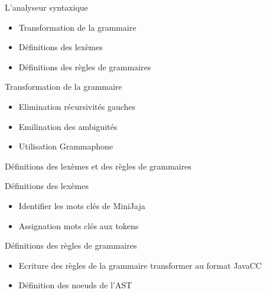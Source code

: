\begin{chapter}{}{L'analyseur syntaxique}
    \begin{itemize}
          \item Transformation de la grammaire
          \item Définitions des lexèmes
          \item Définitions des règles de grammaires
    \end{itemize}
\end{chapter}

\begin{frame}{Transformation de la grammaire}
    \begin{block}{}
        \begin{itemize}
            \item Elimination récursivités gauches
            \item Emilination des ambiguités
            \item Utilisation Grammaphone
        \end{itemize}
    \end{block}
\end{frame}

\begin{frame}{Définitions des lexèmes et des règles de grammaires}
    \begin{block}{Définitions des lexèmes}
        \begin{itemize}
            \item Identifier les mots clés de MiniJaja
            \item Assignation mots clés aux tokens
        \end{itemize}
    \end{block}

    \begin{block}{Définitions des règles de grammaires}
        \begin{itemize}
            \item Ecriture des règles de la grammaire transformer au format JavaCC
            \item Définition des noeuds de l'AST
        \end{itemize}
    \end{block}
    
\end{frame}